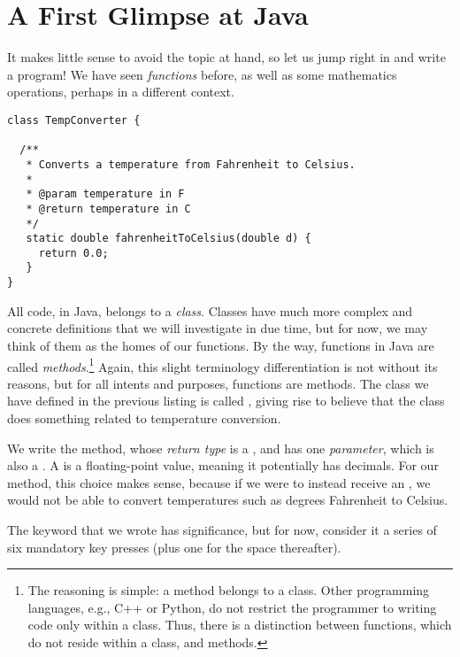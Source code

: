 \section{A First Glimpse at Java}
It makes little sense to avoid the topic at hand, so let us jump right in and write a program! We have seen \textit{functions} before, as well as some mathematics operations, perhaps in a different context. 


\begin{cl}{}
\begin{lstlisting}[language=MyJava]
class TempConverter {
  
  /**
   * Converts a temperature from Fahrenheit to Celsius.
   * 
   * @param temperature in F
   * @return temperature in C
   */
   static double fahrenheitToCelsius(double d) {
     return 0.0;
   }
}
\end{lstlisting}
\end{cl}

All code, in Java, belongs to a \textit{class}. Classes have much more complex and concrete definitions that we will investigate in due time, but for now, we may think of them as the homes of our functions. By the way, functions in Java are called \textit{methods}.\footnote{The reasoning is simple: a method belongs to a class. Other programming languages, e.g., C++ or Python, do not restrict the programmer to writing code only within a class. Thus, there is a distinction between functions, which do not reside within a class, and methods.} Again, this slight terminology differentiation is not without its reasons, but for all intents and purposes, functions are methods. The class we have defined in the previous listing is called , giving rise to believe that the class does something related to temperature conversion.

We write the  method, whose \textit{return type} is a , and has one \textit{parameter}, which is also a . A  is a floating-point value, meaning it potentially has decimals. For our method, this choice makes sense, because if we were to instead receive an , we would not be able to convert temperatures such as  degrees Fahrenheit to Celsius. 

The  keyword that we wrote has significance, but for now, consider it a series of six mandatory key presses (plus one for the space thereafter).

